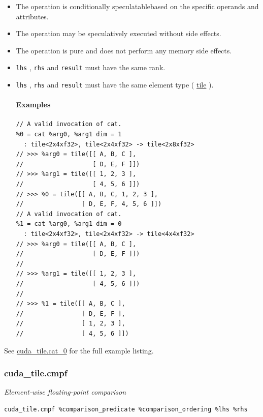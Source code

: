\documentclass{article}
\begin{document}
\begin{itemize}
\item The operation is conditionally speculatablebased on the specific operands and attributes.
\item The operation may be speculatively executed without side effects.
\item The operation is pure and does not perform any memory side effects.
\item \texttt{lhs} , \texttt{rhs} and \texttt{result} must have the same rank.
\item \texttt{lhs} , \texttt{rhs} and \texttt{result} must have the same element type ( \href{https://docs.nvidia.com/cuda/tile-ir/latest/sections/types.html#type-tile}{tile} ).


\paragraph{Examples}

\begin{lstlisting}
// A valid invocation of cat.
%0 = cat %arg0, %arg1 dim = 1
  : tile<2x4xf32>, tile<2x4xf32> -> tile<2x8xf32>
// >>> %arg0 = tile([[ A, B, C ],
//                   [ D, E, F ]])
// >>> %arg1 = tile([[ 1, 2, 3 ],
//                   [ 4, 5, 6 ]])
// >>> %0 = tile([[ A, B, C, 1, 2, 3 ],
//                [ D, E, F, 4, 5, 6 ]])
// A valid invocation of cat.
%1 = cat %arg0, %arg1 dim = 0
  : tile<2x4xf32>, tile<2x4xf32> -> tile<4x4xf32>
// >>> %arg0 = tile([[ A, B, C ],
//                   [ D, E, F ]])
//
// >>> %arg1 = tile([[ 1, 2, 3 ],
//                   [ 4, 5, 6 ]])
//
// >>> %1 = tile([[ A, B, C ],
//                [ D, E, F ],
//                [ 1, 2, 3 ],
//                [ 4, 5, 6 ]])
\end{lstlisting}

\end{itemize}
See \href{https://docs.nvidia.com/cuda/tile-ir/latest/sections/appendix.html#example-cuda-tile-cat-0}{cuda\_tile.cat\_0} for the full example listing.



\subsubsection{cuda\_tile.cmpf}

\textit{Element-wise floating-point comparison}


\begin{lstlisting}
cuda_tile.cmpf %comparison_predicate %comparison_ordering %lhs %rhs
\end{lstlisting}
\end{document}
